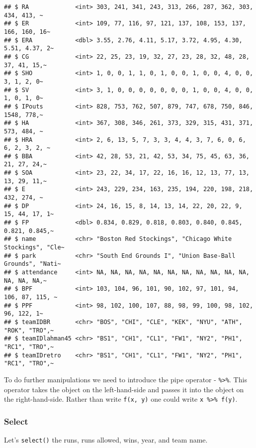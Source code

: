 \documentclass[
]{article}
\begin{document}
\begin{verbatim}
## $ RA             <int> 303, 241, 341, 243, 313, 266, 287, 362, 303, 434, 413, ~
## $ ER             <int> 109, 77, 116, 97, 121, 137, 108, 153, 137, 166, 160, 16~
## $ ERA            <dbl> 3.55, 2.76, 4.11, 5.17, 3.72, 4.95, 4.30, 5.51, 4.37, 2~
## $ CG             <int> 22, 25, 23, 19, 32, 27, 23, 28, 32, 48, 28, 37, 41, 15,~
## $ SHO            <int> 1, 0, 0, 1, 1, 0, 1, 0, 0, 1, 0, 0, 4, 0, 0, 3, 1, 2, 0~
## $ SV             <int> 3, 1, 0, 0, 0, 0, 0, 0, 0, 1, 0, 0, 4, 0, 0, 1, 0, 1, 0~
## $ IPouts         <int> 828, 753, 762, 507, 879, 747, 678, 750, 846, 1548, 778,~
## $ HA             <int> 367, 308, 346, 261, 373, 329, 315, 431, 371, 573, 484, ~
## $ HRA            <int> 2, 6, 13, 5, 7, 3, 3, 4, 4, 3, 7, 6, 0, 6, 6, 2, 3, 2, ~
## $ BBA            <int> 42, 28, 53, 21, 42, 53, 34, 75, 45, 63, 36, 21, 27, 24,~
## $ SOA            <int> 23, 22, 34, 17, 22, 16, 16, 12, 13, 77, 13, 13, 29, 11,~
## $ E              <int> 243, 229, 234, 163, 235, 194, 220, 198, 218, 432, 274, ~
## $ DP             <int> 24, 16, 15, 8, 14, 13, 14, 22, 20, 22, 9, 15, 44, 17, 1~
## $ FP             <dbl> 0.834, 0.829, 0.818, 0.803, 0.840, 0.845, 0.821, 0.845,~
## $ name           <chr> "Boston Red Stockings", "Chicago White Stockings", "Cle~
## $ park           <chr> "South End Grounds I", "Union Base-Ball Grounds", "Nati~
## $ attendance     <int> NA, NA, NA, NA, NA, NA, NA, NA, NA, NA, NA, NA, NA, NA,~
## $ BPF            <int> 103, 104, 96, 101, 90, 102, 97, 101, 94, 106, 87, 115, ~
## $ PPF            <int> 98, 102, 100, 107, 88, 98, 99, 100, 98, 102, 96, 122, 1~
## $ teamIDBR       <chr> "BOS", "CHI", "CLE", "KEK", "NYU", "ATH", "ROK", "TRO",~
## $ teamIDlahman45 <chr> "BS1", "CH1", "CL1", "FW1", "NY2", "PH1", "RC1", "TRO",~
## $ teamIDretro    <chr> "BS1", "CH1", "CL1", "FW1", "NY2", "PH1", "RC1", "TRO",~
\end{verbatim}

To do further manipulations we need to introduce the pipe operator -
\texttt{\%\textgreater{}\%}. This operator takes the object on the
left-hand-side and passes it into the object on the right-hand-side.
Rather than write \texttt{f(x,\ y)} one could write
\texttt{x\ \%\textgreater{}\%\ f(y)}.

\hypertarget{select}{%
\subsubsection{Select}\label{select}}

Let's \texttt{select()} the runs, runs allowed, wins, year, and team
name.
\end{document}
